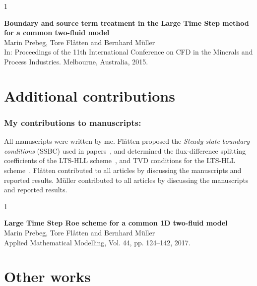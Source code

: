 \begin{conferencepaper}{1~\cite{cp1}}

	{\bfseries Boundary and source term treatment in the Large Time Step method for a common two-fluid model} \\[1em]	
	Marin Prebeg, Tore Fl{\aa}tten and Bernhard M\"{u}ller \\[1em]	
	In: Proceedings of the 11th International Conference on CFD in the Minerals and Process Industries. Melbourne, Australia, 2015.
  
\end{conferencepaper}

\clearpage
\shipout\null

%

\clearpage
\shipout\null

\section{Additional contributions}
\printbibliography[heading=none,prefixnumbers=A,keyword=Additional,resetnumbers]


\subsubsection*{My contributions to manuscripts:}
All manuscripts were written by me. Fl{\aa}tten proposed the \textit{Steady-state boundary conditions} (SSBC) used in papers~\cite{cp1,jp1}, and determined the flux-difference splitting coefficients of the LTS-HLL scheme~\cite[Proposition~2]{jp2}, and TVD conditions for the LTS-HLL scheme~\cite[Proposition~5]{jp2}. Fl{\aa}tten contributed to all articles by discussing the manuscripts and reported results. M\"{u}ller contributed to all articles by discussing the manuscripts and reported results.

\begin{journalpaper}{1~\cite{jp1}}
	
	{\bfseries Large Time Step Roe scheme for a common 1D two-fluid model} \\[1em]	
	Marin Prebeg, Tore Fl{\aa}tten and Bernhard M\"{u}ller                 \\[1em]	
	Applied Mathematical Modelling, Vol. 44, pp. 124--142, 2017. 
	
\end{journalpaper}

\section{Other works}
\printbibliography[heading=none,prefixnumbers=P,keyword=Other,resetnumbers]




